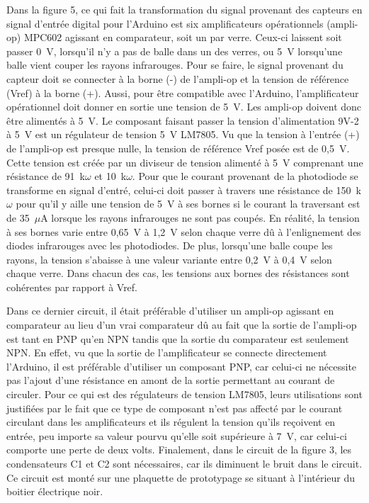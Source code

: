 Dans la figure 5, ce qui fait la transformation du signal provenant des capteurs en signal d’entrée digital pour l’Arduino est six amplificateurs opérationnels (ampli-op) MPC602 agissant en comparateur, soit un par verre.
Ceux-ci laissent soit passer 0~V, lorsqu’il n’y a pas de balle dans un des verres, ou 5~V lorsqu’une balle vient couper les rayons infrarouges.
Pour se faire, le signal provenant du capteur doit se connecter à la borne (-) de l’ampli-op et la tension de référence (Vref) à la borne (+).
Aussi, pour être compatible avec l’Arduino, l’amplificateur opérationnel doit donner en sortie une tension de 5~V.
Les ampli-op doivent donc être alimentés à 5~V.
Le composant faisant passer la tension d’alimentation 9V-2 à 5~V est un régulateur de tension 5~V LM7805.
Vu que la tension à l’entrée (+) de l’ampli-op est presque nulle, la tension de référence Vref posée est de 0,5~V.
Cette tension est créée par un diviseur de tension alimenté à 5~V comprenant une résistance de 91~k$\omega$ et 10~k$\omega$.
Pour que le courant provenant de la photodiode se transforme en signal d'entré, celui-ci doit passer à travers une résistance de 150~k$\omega$ pour qu’il y aille une tension de 5~V à ses bornes si le courant la traversant est de 35~$\mu$A lorsque les rayons infrarouges ne sont pas coupés.
En réalité, la tension à ses bornes varie entre 0,65~V à 1,2~V selon chaque verre dû à l’enlignement des diodes infrarouges avec les photodiodes.
De plus, lorsqu’une balle coupe les rayons, la tension s’abaisse à une valeur variante entre 0,2~V à 0,4~V selon chaque verre.
Dans chacun des cas, les tensions aux bornes des résistances sont cohérentes par rapport à Vref.

Dans ce dernier circuit, il était préférable d’utiliser un ampli-op agissant en comparateur au lieu d’un vrai comparateur dû au fait que la sortie de l’ampli-op est tant en PNP qu'en NPN tandis que la sortie du comparateur est seulement NPN.
En effet, vu que la sortie de l’amplificateur se connecte directement l’Arduino, il est préférable d’utiliser un composant PNP, car celui-ci ne nécessite pas l’ajout d’une résistance en amont de la sortie permettant au courant de circuler.
Pour ce qui est des régulateurs de tension LM7805, leurs utilisations sont justifiées par le fait que ce type de composant n’est pas affecté par le courant circulant dans les amplificateurs et ils régulent la tension qu’ils reçoivent en entrée, peu importe sa valeur pourvu qu’elle soit supérieure à 7~V, car celui-ci comporte une perte de deux volts.
Finalement, dans le circuit de la figure 3, les condensateurs C1 et C2 sont nécessaires, car ils diminuent le bruit dans le circuit.
Ce circuit est monté sur une plaquette de prototypage se situant à l’intérieur du boitier électrique noir.

